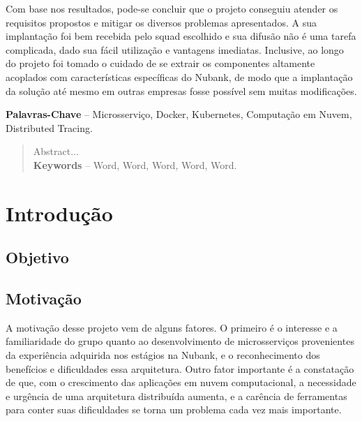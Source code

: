 \documentclass[]{politex}
\begin{document}
\begin{resumo}
	Com base nos resultados, pode-se concluir que o projeto conseguiu atender os requisitos propostos e mitigar os diversos problemas apresentados. A sua implantação foi bem recebida pelo squad escolhido e sua difusão não é uma tarefa complicada, dado sua fácil utilização e vantagens imediatas. Inclusive, ao longo do projeto foi tomado o cuidado de se extrair os componentes altamente acoplados com características específicas do Nubank, de modo que a implantação da solução até mesmo em outras empresas fosse possível sem muitas modificações.
	
%
%
\textbf{Palavras-Chave} -- Microsserviço, Docker, Kubernetes, Computação em Nuvem, Distributed Tracing.
\end{resumo}


\begin{abstract}
Abstract...
%
\\[3\baselineskip]
%
\textbf{Keywords} -- Word, Word, Word, Word, Word.
\end{abstract}






\sumario




	
\chapter{Introdução}
	\section{Objetivo}
	\section{Motivação}
	A motivação desse projeto vem de alguns fatores. O primeiro é o interesse e a familiaridade do grupo quanto ao desenvolvimento de microsserviços provenientes da experiência adquirida nos estágios na Nubank, e o reconhecimento dos benefícios e dificuldades essa arquitetura. Outro fator importante é a constatação de que, com o crescimento das aplicações em nuvem computacional, a necessidade e urgência de uma arquitetura distribuída aumenta, e a carência de ferramentas para conter suas dificuldades se torna um problema cada vez mais importante.
	
\end{document}
